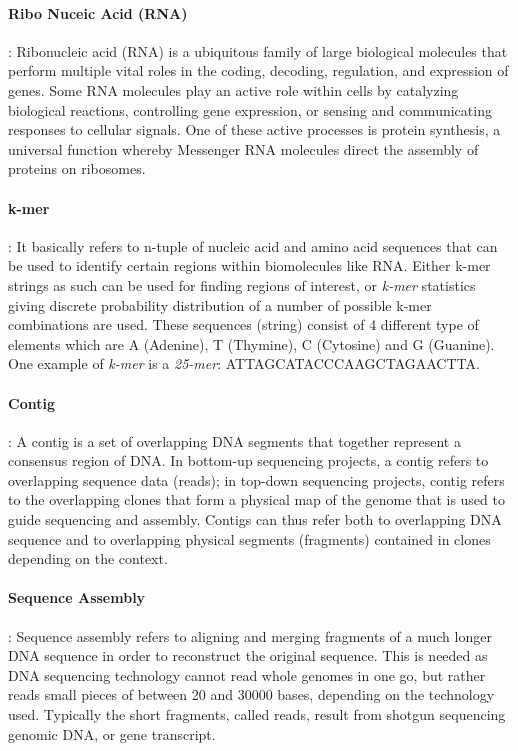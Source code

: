 \documentclass[plainarticle,zihtitle,english,final,hyperref,utf8]{zihpub}
\begin{document}
\paragraph{Ribo Nuceic Acid (RNA)}: Ribonucleic acid (RNA) is a ubiquitous family of large biological molecules that perform multiple vital roles in the coding, decoding, regulation, and expression of genes. Some RNA molecules play an active role within cells by catalyzing biological reactions, controlling gene expression, or sensing and communicating responses to cellular signals. One of these active processes is protein synthesis, a universal function whereby Messenger RNA molecules direct the assembly of proteins on ribosomes.
\paragraph{k-mer}: It basically refers to n-tuple of nucleic acid and amino acid sequences that can be used to identify certain regions within biomolecules like RNA. Either k-mer strings as such can be used for finding regions of interest, or \emph{k-mer} statistics giving discrete probability distribution of a number of possible k-mer combinations are used. These sequences (string) consist of 4 different type of elements which are A (Adenine), T (Thymine), C (Cytosine) and G (Guanine). One example of \emph{k-mer} is a \emph{25-mer}:  ATTAGCATACCCAAGCTAGAACTTA.
\paragraph{Contig}: A contig is a set of overlapping DNA segments that together represent a consensus region of DNA. In bottom-up sequencing projects, a contig refers to overlapping sequence data (reads); in top-down sequencing projects, contig refers to the overlapping clones that form a physical map of the genome that is used to guide sequencing and assembly. Contigs can thus refer both to overlapping DNA sequence and to overlapping physical segments (fragments) contained in clones depending on the context.
\paragraph{Sequence Assembly}: Sequence assembly refers to aligning and merging fragments of a much longer DNA sequence in order to reconstruct the original sequence. This is needed as DNA sequencing technology cannot read whole genomes in one go, but rather reads small pieces of between 20 and 30000 bases, depending on the technology used. Typically the short fragments, called reads, result from shotgun sequencing genomic DNA, or gene transcript.
\end{document}
